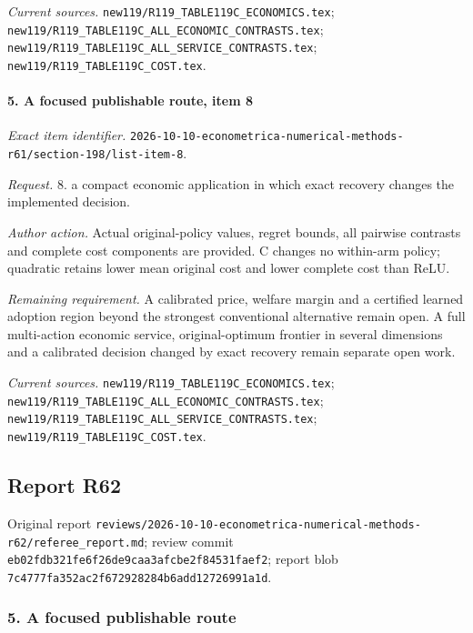 \par\emph{Current sources.} \nolinkurl{new119/R119_TABLE119C_ECONOMICS.tex}; \nolinkurl{new119/R119_TABLE119C_ALL_ECONOMIC_CONTRASTS.tex}; \nolinkurl{new119/R119_TABLE119C_ALL_SERVICE_CONTRASTS.tex}; \nolinkurl{new119/R119_TABLE119C_COST.tex}.

\paragraph{5. A focused publishable route, item 8}

\emph{Exact item identifier.} \nolinkurl{2026-10-10-econometrica-numerical-methods-r61/section-198/list-item-8}.

\par\emph{Request.} 8. a compact economic application in which exact recovery changes the implemented decision.

\par\emph{Author action.} Actual original-policy values, regret bounds, all pairwise contrasts and complete cost components are provided. C changes no within-arm policy; quadratic retains lower mean original cost and lower complete cost than ReLU.

\par\emph{Remaining requirement.} A calibrated price, welfare margin and a certified learned adoption region beyond the strongest conventional alternative remain open. A full multi-action economic service, original-optimum frontier in several dimensions and a calibrated decision changed by exact recovery remain separate open work.

\par\emph{Current sources.} \nolinkurl{new119/R119_TABLE119C_ECONOMICS.tex}; \nolinkurl{new119/R119_TABLE119C_ALL_ECONOMIC_CONTRASTS.tex}; \nolinkurl{new119/R119_TABLE119C_ALL_SERVICE_CONTRASTS.tex}; \nolinkurl{new119/R119_TABLE119C_COST.tex}.

\subsection{Report R62}

Original report \nolinkurl{reviews/2026-10-10-econometrica-numerical-methods-r62/referee_report.md}; review commit \nolinkurl{eb02fdb321fe6f26de9caa3afcbe2f84531faef2}; report blob \nolinkurl{7c4777fa352ac2f672928284b6add12726991a1d}.

\subsubsection{5. A focused publishable route}

